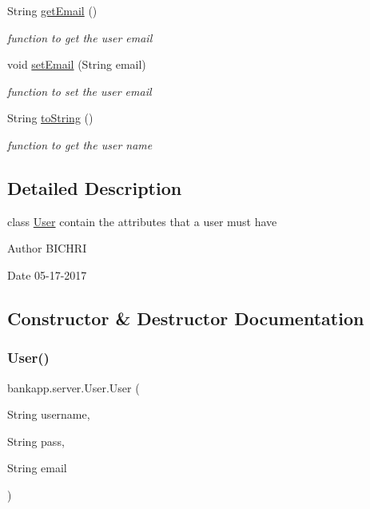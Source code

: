\begin{DoxyCompactItemize}
String \hyperlink{classbankapp_1_1server_1_1User_a597376bdfa749415e75185e764b3e04f}{get\+Email} ()
\begin{DoxyCompactList}\small\item\em function to get the user email \end{DoxyCompactList}\item 
void \hyperlink{classbankapp_1_1server_1_1User_aef6765beb0d9556f38070c919ca7e732}{set\+Email} (String email)
\begin{DoxyCompactList}\small\item\em function to set the user email \end{DoxyCompactList}\item 
String \hyperlink{classbankapp_1_1server_1_1User_a9c6aa2df5a2c7d9cd8b4c4a228f7cbeb}{to\+String} ()
\begin{DoxyCompactList}\small\item\em function to get the user name \end{DoxyCompactList}\end{DoxyCompactItemize}


\subsection{Detailed Description}
class \hyperlink{classbankapp_1_1server_1_1User}{User} contain the attributes that a user must have 

\begin{DoxyAuthor}{Author}
B\+I\+C\+H\+RI 
\end{DoxyAuthor}
\begin{DoxyDate}{Date}
05-\/17-\/2017 
\end{DoxyDate}


\subsection{Constructor \& Destructor Documentation}
\mbox{\label{classbankapp_1_1server_1_1User_ae5d0c0c37ed136f1c3e7534a4af49105}} 
\subsubsection{\texorpdfstring{User()}{User()}}
{\footnotesize\ttfamily bankapp.\+server.\+User.\+User (\begin{DoxyParamCaption}\item[{String}]{username,  }\item[{String}]{pass,  }\item[{String}]{email }\end{DoxyParamCaption})}




